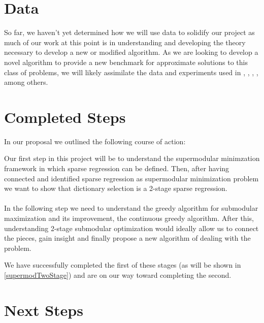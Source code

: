 \documentclass{article}
\begin{document}
\section{Data}
So far, we haven't yet determined how we will use data to solidify our project as much of our work at this point is in understanding and developing the theory necessary to develop a new or modified algorithm. As we are looking to develop a novel algorithm to provide a new benchmark for approximate solutions to this class of problems, we will likely assimilate the data and experiments used in  \cite{submod_spectral}, \cite{greedy_selection}, \cite{rIBP}, \cite{Singer16TwoStage}, among others. 


\section{Completed Steps}

In our proposal we outlined the following course of action:
\begin{displayquote}
Our first step in this project will be to understand the supermodular minimzation framework in which sparse regression can be defined. Then, after having connected and identified sparse regression as supermodular minimization problem we want to show that dictionary selection is a 2-stage sparse regression. \\
\\
In the following step we need to understand the greedy algorithm for submodular maximization and its improvement, the continuous greedy algorithm. After this, understanding 2-stage submodular optimization would ideally allow us to connect the pieces, gain insight and finally propose a new algorithm of dealing with the problem.
\end{displayquote}

We have successfully completed the first of these stages (as will be shown in \ref{supermodTwoStage}) and are on our way toward completing the second.



\section{Next Steps}




\end{document}
